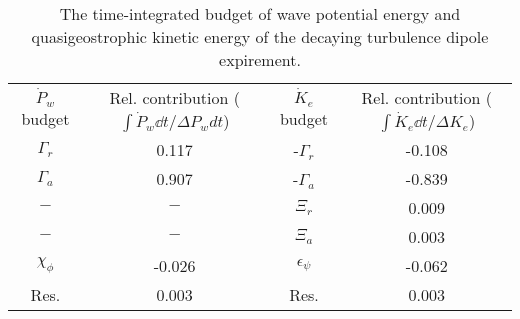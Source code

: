 \begin{table}
\begin{center}
\caption{The time-integrated budget of wave potential energy and quasigeostrophic                kinetic energy of the decaying turbulence dipole expirement. \label{table2}}
\begin{tabular}{cccc}
$\dot{P}_w$ budget & Rel. contribution ($\int\dot{P}_w \dd t/\Delta P_w dt$) & $\dot{K}_e$ budget & Rel. contribution ($\int\dot{K}_e \dd t/\Delta K_e$) \\
$\Gamma_r$ & 0.117 & -$\Gamma_r$ & -0.108 \\
$\Gamma_a$ & 0.907 & -$\Gamma_a$ & -0.839 \\
$-$ & $-$ & $\Xi_r$ & 0.009 \\
$-$ & $-$ & $\Xi_a$ & 0.003 \\
$\chi_\phi$ & -0.026 & $\epsilon_\psi$ & -0.062 \\
Res. & 0.003 & Res. & 0.003 \\
\end{tabular}
\end{center}
\end{table}
